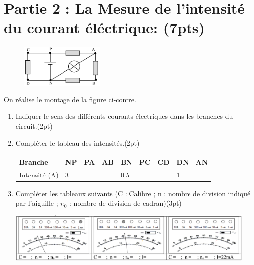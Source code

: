 \documentclass[12pt]{article}
\begin{document}
\section*{Partie 2 : La Mesure de l’intensité du courant éléctrique: \dotfill(7pts)}

\begin{figure}
    \vspace{-1cm}
\begin{center}
    \includegraphics[width=0.36\textwidth]{./img/circuit_01.png}
\end{center}
    \end{figure}
On réalise le montage de la figure ci-contre.
\begin{enumerate}
    \item Indiquer le sens des différents courants électriques dans les
        branches du circuit.\dotfill(2pt)
    \item Compléter le tableau des intensités.\dotfill(2pt)
          \begin{tabular}{ | l | l | l | l |l|l|l|l|l|}
    \hline
              Branche       & NP & PA & AB & BN & PC & CD & DN & AN  \\\hline
              Intensité (A) & 3   &    &    & 0.5   &    &  &1       &       \\ \hline
    \end{tabular}
\item Compléter les tableaux suivants (C : Calibre ; 
n : nombre de division indiqué par l’aiguille ; $n_0$  : nombre de division de cadran)\dotfill(3pt)
\begin{center}
    \includegraphics[width=0.95\textwidth]{./img/circuit_03.png}
\end{center}

\end{enumerate}

\end{document}
